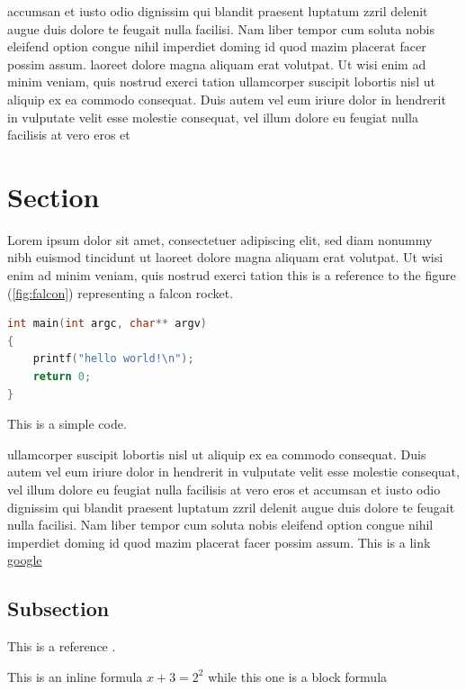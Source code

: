 \documentclass[a4paper, 10pt]{report}
\begin{document}
accumsan et iusto odio dignissim qui blandit praesent luptatum zzril delenit augue duis dolore te feugait nulla facilisi.
Nam liber tempor cum soluta nobis eleifend option congue nihil imperdiet doming id quod mazim placerat facer possim assum.
laoreet dolore magna aliquam erat volutpat. Ut wisi enim ad minim veniam, quis nostrud exerci tation
ullamcorper suscipit lobortis nisl ut aliquip ex ea commodo consequat. Duis autem vel eum iriure dolor in hendrerit in
vulputate velit esse molestie consequat, vel illum dolore eu feugiat nulla facilisis at vero eros et


\section{Section}

Lorem ipsum
dolor sit amet, consectetuer adipiscing elit, sed diam nonummy nibh euismod tincidunt ut
laoreet dolore magna aliquam erat volutpat. Ut wisi enim ad minim veniam, quis nostrud exerci tation this is a reference to the figure (\ref{fig:falcon}) representing a falcon rocket.

\begin{program}
\begin{center}

\begin{lstlisting}[language=c]
int main(int argc, char** argv)
{
    printf("hello world!\n");
    return 0;
}
\end{lstlisting}

\caption{This is a simple code.}
\end{center}
\end{program}

ullamcorper suscipit lobortis nisl ut aliquip ex ea commodo consequat. Duis autem vel eum iriure dolor in hendrerit in
vulputate velit esse molestie consequat, vel illum dolore eu feugiat nulla facilisis at vero eros et
accumsan et iusto odio dignissim qui blandit praesent luptatum zzril delenit augue duis dolore te feugait nulla facilisi.
Nam liber tempor cum soluta nobis eleifend option congue nihil imperdiet doming id quod mazim placerat facer possim assum.
This is a link \href{www.google.com"}{google}


\subsection{Subsection}

This is a reference \cite{fnref:1}.


This is an inline formula \(x+3 = 2^2\) while this one is a block formula
\end{document}
